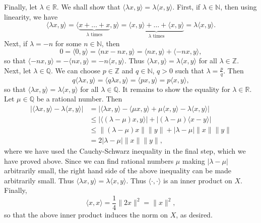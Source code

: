 \documentclass[11pt]{article}
\theoremstyle{thmstyle}
\theoremstyle{defstyle}
\newcommand{\R}{\mathbb{R}}
\newcommand{\Q}{\mathbb{Q}}
\newcommand{\Z}{\mathbb{Z}}
\newcommand{\N}{\mathbb{N}}
\renewcommand{\le}{\leqslant}
\begin{document}
Finally, let $\lambda\in\R$. We shall show that $\langle\lambda x, y\rangle = \lambda\langle x, y\rangle$. First, if $\lambda\in\N$, then using linearity, we have 
\begin{equation*}
    \langle\lambda x, y\rangle = \langle \underbrace{x + \dots + x}_{\lambda\text{ times}}, y\rangle = \underbrace{\langle x, y\rangle + \dots + \langle x, y\rangle}_{\lambda\text{ times}} = \lambda\langle x, y\rangle.
\end{equation*}
Next, if $\lambda = -n$ for some $n\in\N$, then 
\begin{equation*}
    0 = \langle 0, y\rangle = \langle nx - nx, y\rangle = \langle nx, y\rangle + \langle -nx, y\rangle,
\end{equation*}
so that $\langle -nx, y\rangle = -\langle nx, y\rangle = -n\langle x, y\rangle$. Thus $\langle\lambda x, y\rangle = \lambda\langle x, y\rangle$ for all $\lambda\in\Z$. Next, let $\lambda\in\Q$. We can choose $p\in\Z$ and $q\in\N$, $q > 0$ such that $\lambda = \frac{p}{q}$. Then 
\begin{equation*}
    q\langle\lambda x, y\rangle = \langle q\lambda x, y\rangle = \langle px, y\rangle = p\langle x, y\rangle,
\end{equation*}
so that $\langle\lambda x, y\rangle = \lambda\langle x, y\rangle$ for all $\lambda\in\Q$. It remains to show the equality for $\lambda\in\R$. Let $\mu\in\Q$ be a rational number. Then 
\begin{align*}
    \left|\langle\lambda x , y\rangle - \lambda\langle x, y\rangle\right| &= \left|\langle\lambda x, y\rangle - \langle \mu x, y\rangle + \mu\langle x, y\rangle - \lambda\langle x, y\rangle \right|\\
    &\le\left|\langle (\lambda - \mu)x, y\rangle\right| + \left|(\lambda - \mu)\langle x - y\rangle\right|\\
    &\le\|(\lambda - \mu)x\|\|y\| + |\lambda - \mu|\|x\|\|y\|\\
    &= 2|\lambda - \mu|\|x\|\|y\|,
\end{align*}
where we have used the Cauchy-Schwarz inequality in the final step, which we have proved above. Since we can find rational numbers $\mu$ making $|\lambda - \mu|$ arbitrarily small, the right hand side of the above inequality can be made arbitrarily small. Thus $\langle\lambda x, y\rangle = \lambda\langle x, y\rangle$. Thus $\langle\cdot,\cdot\rangle$ is an inner product on $X$. Finally, 
\begin{equation*}
    \langle x, x\rangle = \frac{1}{4}\|2x\|^2 = \|x\|^2,
\end{equation*}
so that the above inner product induces the norm on $X$, as desired.
\end{document}
